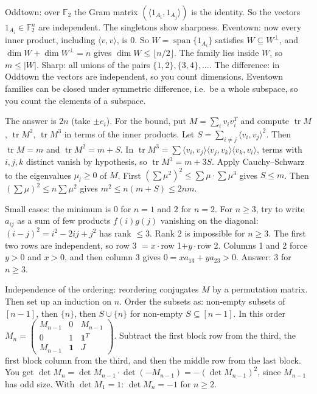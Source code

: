\documentclass[11pt,a4paper]{article}
\begin{document}

Oddtown: over \(\mathbb F_2\) the Gram matrix \((\langle 1_{A_i},1_{A_j}\rangle)\) is the identity. So the vectors \(1_{A_i}\in\mathbb F_2^n\) are independent. The singletons show sharpness.
Eventown: now every inner product, including \(\langle v,v\rangle\), is \(0\). So \(W=\operatorname{span}\{1_{A_i}\}\) satisfies \(W\subseteq W^\perp\), and \(\dim W+\dim W^\perp=n\) gives \(\dim W\le\lfloor n/2\rfloor\). The family lies inside \(W\), so \(m\le|W|\). Sharp: all unions of the pairs \(\{1,2\},\{3,4\},\dots\).
The difference: in Oddtown the vectors are independent, so you count dimensions. Eventown families can be closed under symmetric difference, i.e.\ be a whole subspace, so you count the elements of a subspace.

The answer is \(2n\) (take \(\pm e_i\)). For the bound, put \(M=\sum_i v_iv_i^T\) and compute \(\operatorname{tr}M\), \(\operatorname{tr}M^2\), \(\operatorname{tr}M^3\) in terms of the inner products.
Let \(S=\sum_{i\ne j}\langle v_i,v_j\rangle^2\). Then \(\operatorname{tr}M=m\) and \(\operatorname{tr}M^2=m+S\). In \(\operatorname{tr}M^3=\sum\langle v_i,v_j\rangle\langle v_j,v_k\rangle\langle v_k,v_i\rangle\), terms with \(i,j,k\) distinct vanish by hypothesis, so \(\operatorname{tr}M^3=m+3S\).
Apply Cauchy--Schwarz to the eigenvalues \(\mu_l\ge0\) of \(M\). First \((\sum\mu^2)^2\le\sum\mu\cdot\sum\mu^3\) gives \(S\le m\). Then \((\sum\mu)^2\le n\sum\mu^2\) gives \(m^2\le n(m+S)\le2nm\).

Small cases: the minimum is \(0\) for \(n=1\) and \(2\) for \(n=2\). For \(n\ge3\), try to write \(a_{ij}\) as a sum of few products \(f(i)g(j)\) vanishing on the diagonal: \((i-j)^2=i^2-2ij+j^2\) has rank \(\le3\).
Rank \(2\) is impossible for \(n\ge3\). The first two rows are independent, so row 3 \(=x\cdot\)row 1\(+y\cdot\)row 2. Columns 1 and 2 force \(y>0\) and \(x>0\), and then column 3 gives \(0=xa_{13}+ya_{23}>0\). Answer: \(3\) for \(n\ge3\).

Independence of the ordering: reordering conjugates \(M\) by a permutation matrix. Then set up an induction on \(n\). Order the subsets as: non-empty subsets of \([n-1]\), then \(\{n\}\), then \(S\cup\{n\}\) for non-empty \(S\subseteq[n-1]\).
In this order \(M_n=\begin{pmatrix}M_{n-1}&0&M_{n-1}\\0&1&\mathbf 1^T\\M_{n-1}&\mathbf 1&J\end{pmatrix}\). Subtract the first block row from the third, the first block column from the third, and then the middle row from the last block.
You get \(\det M_n=\det M_{n-1}\cdot\det(-M_{n-1})=-(\det M_{n-1})^2\), since \(M_{n-1}\) has odd size. With \(\det M_1=1\): \(\det M_n=-1\) for \(n\ge2\).
\end{document}
